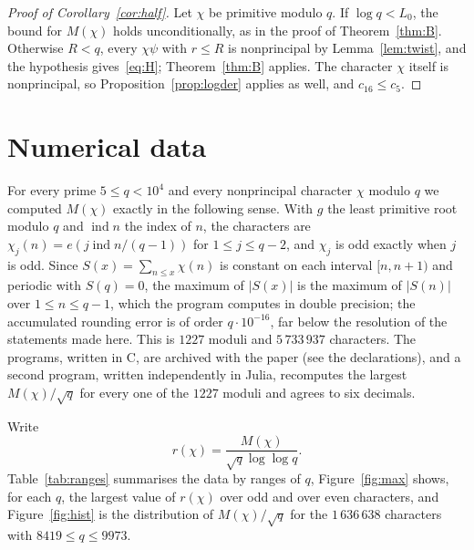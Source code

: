 \documentclass[11pt,a4paper,reqno]{amsart}
\theoremstyle{remark}
\numberwithin{equation}{section}
\begin{document}
\begin{proof}[Proof of Corollary~\ref{cor:half}]
Let $\chi$ be primitive modulo $q$. If $\log q<L_0$, the bound for $M(\chi)$ holds unconditionally, as in the proof of Theorem~\ref{thm:B}. Otherwise $R<q$, every $\chi\psi$ with $r\le R$ is nonprincipal by Lemma~\ref{lem:twist}, and the hypothesis gives~\eqref{eq:H}; Theorem~\ref{thm:B} applies. The character $\chi$ itself is nonprincipal, so Proposition~\ref{prop:logder} applies as well, and $c_{16}\le c_5$.
\end{proof}
\section{Numerical data}\label{sec:num}

For every prime $5\le q<10^4$ and every nonprincipal character $\chi$ modulo $q$ we computed $M(\chi)$ exactly in the following sense. With $g$ the least primitive root modulo $q$ and $\operatorname{ind}n$ the index of $n$, the characters are $\chi_j(n)=e(j\operatorname{ind}n/(q-1))$ for $1\le j\le q-2$, and $\chi_j$ is odd exactly when $j$ is odd. Since $S(x)=\sum_{n\le x}\chi(n)$ is constant on each interval $[n,n+1)$ and periodic with $S(q)=0$, the maximum of $|S(x)|$ is the maximum of $|S(n)|$ over $1\le n\le q-1$, which the program computes in double precision; the accumulated rounding error is of order $q\cdot10^{-16}$, far below the resolution of the statements made here. This is $1227$ moduli and $5\,733\,937$ characters. The programs, written in C, are archived with the paper (see the declarations), and a second program, written independently in Julia, recomputes the largest $M(\chi)/\sqrt q$ for every one of the $1227$ moduli and agrees to six decimals.

Write
\[
  r(\chi)=\frac{M(\chi)}{\sqrt q\log\log q}.
\]
Table~\ref{tab:ranges} summarises the data by ranges of $q$, Figure~\ref{fig:max} shows, for each $q$, the largest value of $r(\chi)$ over odd and over even characters, and Figure~\ref{fig:hist} is the distribution of $M(\chi)/\sqrt q$ for the $1\,636\,638$ characters with $8419\le q\le9973$.
\end{document}
